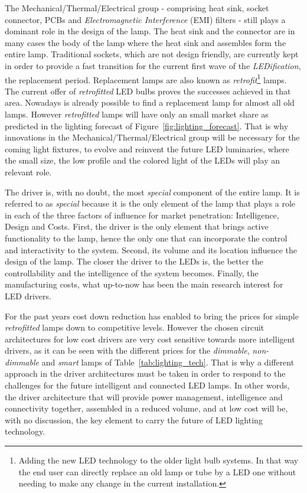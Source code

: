 The Mechanical/Thermal/Electrical group - comprising heat sink, socket connector, PCBs and \emph{Electromagnetic Interference} (EMI) filters - still plays a dominant role in the design of the lamp. The heat sink and the connector are in many cases the body of the lamp where the heat sink and assembles form the entire lamp. Traditional sockets, which are not design friendly, are currently kept in order to provide a fast transition for the current first wave of the \emph{LEDification}, the replacement period. Replacement lamps are also known as \emph{retrofit}\footnote{Adding the new LED technology to the older light bulb systems. In that way the end user can directly replace an old lamp or tube by a LED one without needing to make any change in the current installation.} lamps. The current offer of \emph{retrofitted} LED bulbs proves the successes achieved in that area. Nowadays is already possible to find a replacement lamp for almost all old lamps. However \emph{retrofitted} lamps will have only an small market share as predicted in the lighting forecast of Figure~\ref{fig:lighting_forecast}. That is why innovations in the Mechanical/Thermal/Electrical group will be necessary for the coming light fixtures, to evolve and reinvent the future LED luminaries, where the small size, the low profile and the colored light of the LEDs will play an relevant role.


The driver is, with no doubt, the most \emph{special} component of the entire lamp. It is referred to as \emph{special} because it is the only element of the lamp that plays a role in each of the three factors of influence for market penetration: Intelligence, Design and Costs. First, the driver is the only element that brings active functionality to the lamp, hence the only one that can incorporate the control and interactivity to the system. Second, its volume and its location influence the design of the lamp. The closer the driver to the LEDs is, the better the controllability and the intelligence of the system becomes. Finally, the manufacturing costs, what up-to-now has been the main research interest for LED drivers.

For the past years cost down reduction has enabled to bring the prices for simple \emph{retrofitted} lamps down to competitive levels. However the chosen circuit architectures for low cost drivers are very cost sensitive towards more intelligent drivers, as it can be seen with the different prices for the \emph{dimmable}, \emph{non-dimmable} and \emph{smart} lamps of  Table~\ref{tab:lighting_tech}. That is why a different approach in the driver architectures must be taken in order to respond to the challenges for the future intelligent and connected LED lamps. In other words, the driver architecture that will provide power management, intelligence and connectivity together, assembled in a reduced volume, and at low cost will be, with no discussion, the key element to carry the future of LED lighting technology.

